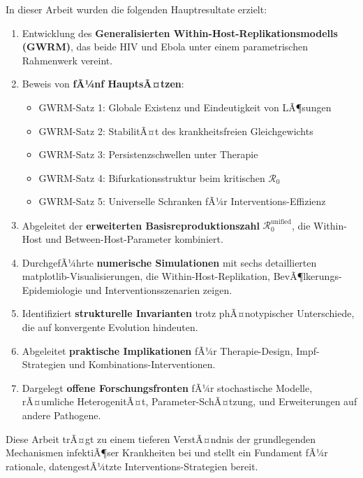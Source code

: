 ﻿\documentclass[a4paper,12pt]{article}
\theoremstyle{definition}
\begin{document}
In dieser Arbeit wurden die folgenden Hauptresultate erzielt:

\begin{enumerate}
\item Entwicklung des \textbf{Generalisierten Within-Host-Replikationsmodells (GWRM)}, das beide HIV und Ebola unter einem parametrischen Rahmenwerk vereint.

\item Beweis von \textbf{fÃ¼nf HauptsÃ¤tzen}:
\begin{itemize}
\item GWRM-Satz 1: Globale Existenz und Eindeutigkeit von LÃ¶sungen
\item GWRM-Satz 2: StabilitÃ¤t des krankheitsfreien Gleichgewichts
\item GWRM-Satz 3: Persistenzschwellen unter Therapie
\item GWRM-Satz 4: Bifurkationsstruktur beim kritischen $\mathcal{R}_0$
\item GWRM-Satz 5: Universelle Schranken fÃ¼r Interventions-Effizienz
\end{itemize}

\item Abgeleitet der \textbf{erweiterten Basisreproduktionszahl} $\mathcal{R}_0^{\text{unified}}$, die Within-Host und Between-Host-Parameter kombiniert.

\item DurchgefÃ¼hrte \textbf{numerische Simulationen} mit sechs detaillierten matplotlib-Visualisierungen, die Within-Host-Replikation, BevÃ¶lkerungs-Epidemiologie und Interventionsszenarien zeigen.

\item Identifiziert \textbf{strukturelle Invarianten} trotz phÃ¤notypischer Unterschiede, die auf konvergente Evolution hindeuten.

\item Abgeleitet \textbf{praktische Implikationen} fÃ¼r Therapie-Design, Impf-Strategien und Kombinations-Interventionen.

\item Dargelegt \textbf{offene Forschungsfronten} fÃ¼r stochastische Modelle, rÃ¤umliche HeterogenitÃ¤t, Parameter-SchÃ¤tzung, und Erweiterungen auf andere Pathogene.

\end{enumerate}

Diese Arbeit trÃ¤gt zu einem tieferen VerstÃ¤ndnis der grundlegenden Mechanismen infektiÃ¶ser Krankheiten bei und stellt ein Fundament fÃ¼r rationale, datengestÃ¼tzte Interventions-Strategien bereit.
\end{document}
